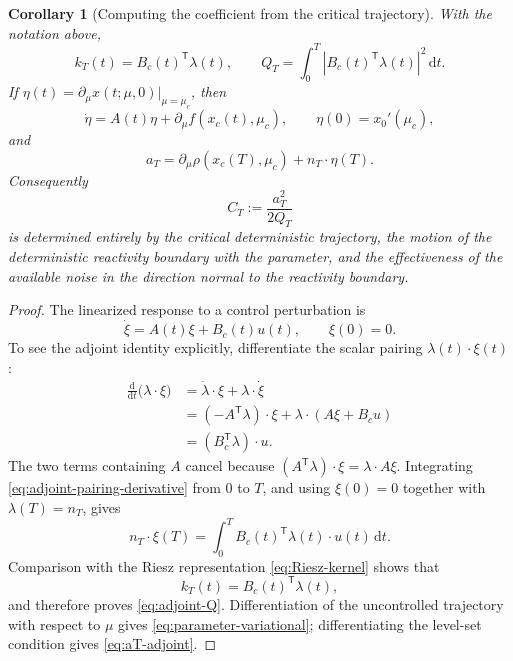 \documentclass[11pt]{article}
\newtheorem{corollary}[theorem]{Corollary}
\theoremstyle{definition}
\theoremstyle{remark}
\newcommand{\dd}{\mathrm{d}}
\newcommand{\cT}{\mathsf{T}}
\begin{document}
\begin{corollary}[Computing the coefficient from the critical trajectory]
\label{cor:adjoint-coefficient}
With the notation above,
\begin{equation}
k_T(t)=B_c(t)^{\cT}\lambda(t),
\qquad
Q_T=\int_0^T|B_c(t)^{\cT}\lambda(t)|^2\,\dd t.
\label{eq:adjoint-Q}
\end{equation}
If $\eta(t)=\partial_\mu x(t;\mu,0)|_{\mu=\mu_c}$, then
\begin{equation}
\dot\eta=A(t)\eta+\partial_\mu f(x_c(t),\mu_c),
\qquad
\eta(0)=x_0'(\mu_c),
\label{eq:parameter-variational}
\end{equation}
and
\begin{equation}
a_T
=\partial_\mu\rho(x_c(T),\mu_c)+n_T\cdot\eta(T).
\label{eq:aT-adjoint}
\end{equation}
Consequently
\begin{equation}
C_T:=\frac{a_T^2}{2Q_T}
\label{eq:CT-coefficient}
\end{equation}
is determined entirely by the critical deterministic trajectory, the motion of the deterministic reactivity boundary with the parameter, and the effectiveness of the available noise in the direction normal to the reactivity boundary.
\end{corollary}

\begin{proof}
The linearized response to a control perturbation is
\begin{equation}
\dot\xi=A(t)\xi+B_c(t)u(t),
\qquad \xi(0)=0.
\end{equation}
To see the adjoint identity explicitly, differentiate the scalar pairing $\lambda(t)\cdot\xi(t)$:
\begin{align}
\frac{\dd}{\dd t}\bigl(\lambda\cdot\xi\bigr)
&=\dot\lambda\cdot\xi+\lambda\cdot\dot\xi\\
&=(-A^{\cT}\lambda)\cdot\xi
 +\lambda\cdot(A\xi+B_cu)\\
&=(B_c^{\cT}\lambda)\cdot u.
\label{eq:adjoint-pairing-derivative}
\end{align}
The two terms containing $A$ cancel because $(A^{\cT}\lambda)\cdot\xi=\lambda\cdot A\xi$.  Integrating \eqref{eq:adjoint-pairing-derivative} from $0$ to $T$, and using $\xi(0)=0$ together with $\lambda(T)=n_T$, gives
\begin{equation}
n_T\cdot\xi(T)
=\int_0^T B_c(t)^{\cT}\lambda(t)\cdot u(t)\,\dd t.
\label{eq:adjoint-pairing-integral}
\end{equation}
Comparison with the Riesz representation \eqref{eq:Riesz-kernel} shows that
\[
k_T(t)=B_c(t)^{\cT}\lambda(t),
\]
and therefore proves \eqref{eq:adjoint-Q}.  Differentiation of the uncontrolled trajectory with respect to $\mu$ gives \eqref{eq:parameter-variational}; differentiating the level-set condition gives \eqref{eq:aT-adjoint}.
\end{proof}
\end{document}

